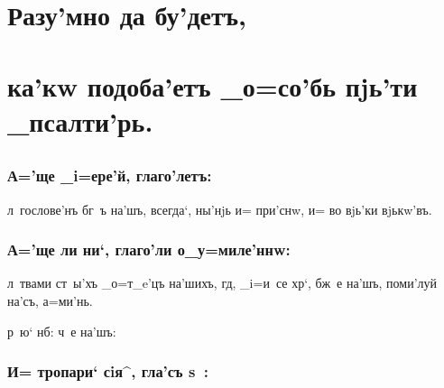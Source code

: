 \documentclass[12pt,a6paper,twoside,dvips,civil=antiqua,cs=pochaev]{hipbook}
\begin{document}

\maketitle



\stdsecondpage


\hdrcrosspage

\section{{\Large Разу'мно да бу'детъ,}}
\section[Разу'мно да бу'детъ,]{ка'кw подоба'етъ _о=со'бь пjь'ти _псалти'рь.}
\subsection[ка'кw подоба'етъ _о=со'бь пjь'ти _псалти'рь.]{}
\baselineskip

\subsubsection{А='ще _i=ере'й, глаго'летъ:}

л~гослове'нъ бг~ъ на'шъ, всегда`, ны'нjь и= при'снw, и= во
вjь'ки вjькw'въ.

\subsubsection{А='ще ли ни`, глаго'ли о_у=миле'ннw:}

л~твами ст~ы'хъ _о=т_e'цъ на'шихъ, гд, _i=и~се хр`,
бж~е на'шъ, поми'луй на'съ, а=ми'нь.

р~ю` нб:  ч~е на'шъ:

\subsubsection{И= тропари` сiя^, гла'съ s~:}
\end{document}
